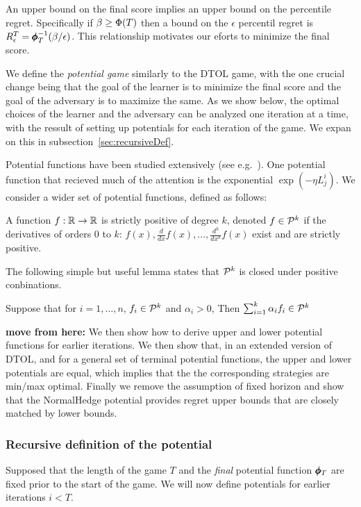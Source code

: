 \documentclass{article}[12pt]
\begin{document}
An upper bound on the final score implies an upper bound on the
percentile regret. Specifically if $\beta \geq \Phi(T)$ then a bound
on the $\epsilon$ percentil regret is
$R^T_\epsilon= \pmb{\phi}_{T}^{-1}(\beta/\epsilon)$.  This relationship
motivates our eforts to minimize the final score.

We define the {\em potential game} similarly to the DTOL game, with
the one crucial change being that the goal of the learner is to
minimize the final score and the goal of the adversary is to maximize
the same. As we show below, the optimal choices of the learner and the
adversary can be analyzed one iteration at a time, with the ressult of setting up potentials for each iteration of the game. We expan on this in subsection~\ref{sec:recursiveDef}.

Potential functions have been studied extensively (see
e.g.~\cite{CesaBinachiLugosi}). One potential function that recieved
much of the attention is the exponential $\exp(-\eta L_j^i)$. We consider a wider set of potential functions, defined as follows:

\begin{definition}
A function $f:\mathbb{R} \to \mathbb{R}$ is strictly positive of degree $k$, 
denoted $f \in {\cal P}^{k}$ if the derivatives of orders 0 to $k$:  
$f(x), \frac{d}{dx}f(x), \ldots, \frac{d^k}{dx^k}f(x)$ exist and are strictly positive.
\end{definition}
The following simple but useful lemma states that ${\cal P}^{k}$ is closed
under positive conbinations.
\begin{lemma}  \label{lemma:SP-pos-comb}
  Suppose that for $i =1,\ldots,n$, $f_i \in {\cal P}^{k}$ and $\alpha_i>0$,
  Then $\sum_{i=1}^k \alpha_i f_i \in {\cal P}^{k}$
\end{lemma}

{\bf move from here:}
We then show how to derive upper and lower potential
functions for earlier iterations. We then show that, in an extended
version of DTOL, and for a general set of terminal potential
functions, the upper and lower potentials are equal, which implies
that the the corresponding strategies are min/max optimal. Finally we
remove the assumption of fixed horizon and show that the NormalHedge
potential provides regret upper bounds that are closely matched by
lower bounds.



\subsubsection{Recursive definition of the potential \label{sec:recursiveDef}}
Supposed that the length of the game $T$ and the {\em final} potential
function $\pmb{\phi}_{T}$ are fixed prior to the start of the game. We
will now define potentials for earlier iterations $i < T$.
\end{document}
